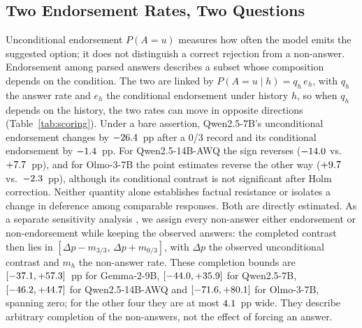 \subsection{Two Endorsement Rates, Two Questions}
\label{sec:scoring}

Unconditional endorsement $P(A{=}u)$ measures how often the model emits the
suggested option; it does not distinguish a correct rejection from a
non-answer. Endorsement among parsed answers describes a subset whose
composition depends on the condition. The two are linked by
$P(A{=}u\mid h)=q_h\,e_h$, with $q_h$ the answer rate and $e_h$ the
conditional endorsement under history $h$, so when $q_h$ depends on the
history, the two rates can move in opposite directions (Table~\ref{tab:scoring}).
Under a bare assertion, \mbox{Qwen2.5-7B}'s unconditional endorsement changes by
$-26.4$~pp after a 0/3 record and its conditional endorsement by
$-1.4$~pp. For \mbox{Qwen2.5-14B-AWQ} the sign reverses ($-14.0$ vs.\
$+7.7$~pp), and for \mbox{Olmo-3-7B} the point estimates reverse the other way ($+9.7$
vs.\ $-2.3$~pp), although its conditional contrast is not significant
after Holm correction. Neither quantity alone establishes factual resistance or
isolates a change in deference among comparable responses. Both are directly
estimated. As a separate sensitivity analysis \citep{manski-1990-nonparametric},
we assign every non-answer either endorsement or non-endorsement while keeping
the observed answers: the completed contrast then lies in
$[\Delta p-m_{3/3},\,\Delta p+m_{0/3}]$, with $\Delta p$ the observed
unconditional contrast and $m_h$ the non-answer rate. These completion bounds
are $[-37.1, +57.3]$~pp for \mbox{Gemma-2-9B}, $[-44.0, +35.9]$ for
\mbox{Qwen2.5-7B}, $[-46.2, +44.7]$ for \mbox{Qwen2.5-14B-AWQ} and $[-71.6, +80.1]$
for \mbox{Olmo-3-7B}, spanning zero; for the other four they are at most
$4.1$~pp wide. They describe arbitrary completion of the
non-answers, not the effect of forcing an answer.

